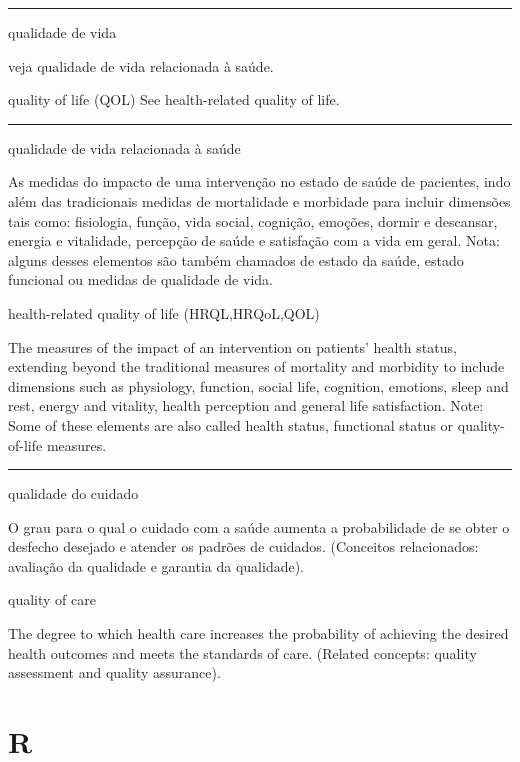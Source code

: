 \documentclass[
  openany]{book}
\begin{document}
\begin{center}\rule{0.5\linewidth}{0.5pt}\end{center}

qualidade de vida

veja qualidade de vida relacionada à saúde.

quality of life (QOL)
See health-related quality of life.

\begin{center}\rule{0.5\linewidth}{0.5pt}\end{center}

qualidade de vida relacionada à saúde

As medidas do impacto de uma intervenção no estado de saúde de pacientes, indo além das tradicionais medidas de mortalidade e morbidade para incluir dimensões tais como: fisiologia, função, vida social, cognição, emoções, dormir e descansar, energia e vitalidade, percepção de saúde e satisfação com a vida em geral. Nota: alguns desses elementos são também chamados de estado da saúde, estado funcional ou medidas de qualidade de vida.

health-related quality of life (HRQL,HRQoL,QOL)

The measures of the impact of an intervention on patients' health status, extending beyond the traditional measures of mortality and morbidity to include dimensions such as physiology, function, social life, cognition, emotions, sleep and rest, energy and vitality, health perception and general life satisfaction. Note: Some of these elements are also called health status, functional status or quality-of-life measures.

\begin{center}\rule{0.5\linewidth}{0.5pt}\end{center}

qualidade do cuidado

O grau para o qual o cuidado com a saúde aumenta a probabilidade de se obter o desfecho desejado e atender os padrões de cuidados. (Conceitos relacionados: avaliação da qualidade e garantia da qualidade).

quality of care

The degree to which health care increases the probability of achieving the desired health outcomes and meets the standards of care. (Related concepts: quality assessment and quality assurance).

\hypertarget{r}{%
\chapter*{R}\label{r}}
\end{document}
